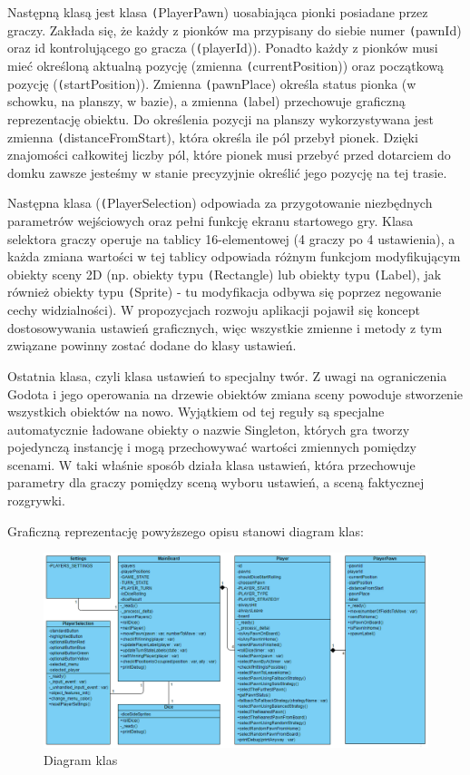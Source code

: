 \documentclass[conference]{IEEEtran}
\begin{document}
Następną klasą jest klasa \texttt(PlayerPawn) uosabiająca pionki posiadane przez graczy. Zakłada się, że każdy z pionków ma przypisany do siebie numer \texttt(pawnId) oraz id kontrolującego go gracza (\texttt(playerId)). Ponadto każdy z pionków musi mieć określoną aktualną pozycję (zmienna \texttt(currentPosition)) oraz początkową pozycję (\texttt(startPosition)). Zmienna \texttt(pawnPlace) określa status pionka (w schowku, na planszy, w bazie), a zmienna \texttt(label) przechowuje graficzną reprezentację obiektu. Do określenia pozycji na planszy wykorzystywana jest zmienna \texttt(distanceFromStart), która określa ile pól przebył pionek. Dzięki znajomości całkowitej liczby pól, które pionek musi przebyć przed dotarciem do domku zawsze jesteśmy w stanie precyzyjnie określić jego pozycję na tej trasie. 


Następna klasa (\texttt(PlayerSelection) odpowiada za przygotowanie niezbędnych parametrów wejściowych oraz pełni funkcję ekranu startowego gry. Klasa selektora graczy operuje na tablicy 16-elementowej (4 graczy po 4 ustawienia), a każda zmiana wartości w tej tablicy odpowiada różnym funkcjom modyfikującym obiekty sceny 2D (np. obiekty typu \texttt(Rectangle) lub obiekty typu \texttt(Label), jak również obiekty typu \texttt(Sprite) - tu modyfikacja odbywa się poprzez negowanie cechy widzialności). W propozycjach rozwoju aplikacji pojawił się koncept dostosowywania ustawień graficznych, więc wszystkie zmienne i metody z tym związane powinny zostać dodane do klasy ustawień.


Ostatnia klasa, czyli klasa ustawień to specjalny twór. Z uwagi na ograniczenia Godota i jego operowania na drzewie obiektów zmiana sceny powoduje stworzenie wszystkich obiektów na nowo. Wyjątkiem od tej reguły są specjalne automatycznie ładowane obiekty o nazwie Singleton, których gra tworzy pojedynczą instancję i mogą przechowywać wartości zmiennych pomiędzy scenami. W taki właśnie sposób działa klasa ustawień, która przechowuje parametry dla graczy pomiędzy sceną wyboru ustawień, a sceną faktycznej rozgrywki.


Graficzną reprezentację powyższego opisu stanowi diagram klas:

\begin{figure}[H]
    \centering
    \includegraphics[width=\linewidth]{ClassDiagram.png}
    \caption{Diagram klas}
\end{figure}
\end{document}
